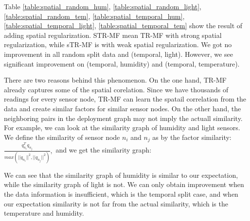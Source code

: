 Table \ref{table:spatial_random_hum}, \ref{table:spatial_random_light}, \ref{table:spatial_random_tem}, \ref{table:spatial_temporal_hum}, \ref{table:spatial_temporal_light}, \ref{table:spatial_temporal_tem}  show the result of adding spatial regularization. 
STR-MF mean TR-MF with strong spatial regularization, while sTR-MF is with weak spatial regularization. We got no improvement in all random split data and (temporal, light). However, we see significant improvement on (temporal, humidity) and (temporal, temperature).

There are two reasons behind this phenomenon. 
On the one hand, TR-MF already captures some of the spatial corelation. 
Since we have thousands of readings for every sensor node, TR-MF can learn the spatail correlation from the data and create similar factors for similar sensor nodes. 
On the other hand, the neighboring pairs in the deployment graph may not imply the actuall similarity.
For example, we can look at the similarity graph of humidity and light sensors.
We define the similarity of sensor node $n_i$ and $n_j$ as by the factor similarity:
$\frac{q_{n_i}^T q_{n_j}}{max(||q_{n_i}||^2, ||q_{n_j}||^2)},$
and we get the similarity graph:
\begin{figure}[ftbp]
\hspace{1in}
\end{figure}

We can see that the similarity graph of humidity is similar to our expectation, while the similarity graph of light is not. We can only obtain improvement when the data information is insufficient, which is the temporal split case, and when our expectation similarity is not far from the actual similarity, which is the temperature and humidity.


